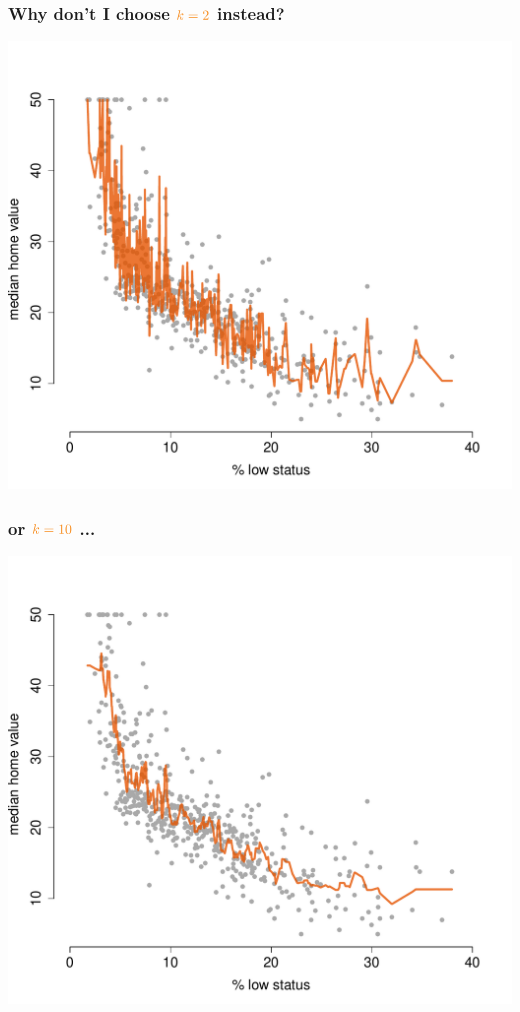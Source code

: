 \documentclass{beamer}
\newcommand{\bo}[1]{\textcolor{burntorange}{#1}}
\begin{document}
\begin{frame}[plain]
\frametitle{Why don't I choose $\bo{k=2}$ instead?}
\vspace{-8mm}
\begin{center}
\includegraphics[scale=.44]{DaveBostonplotk=2i=1.pdf}
\end{center}
\end{frame}

\begin{frame}[plain]
\frametitle{or $\bo{k=10}$ ...}
\vspace{-8mm}
\begin{center}
\includegraphics[scale=.44]{DaveBostonplotk=10i=2.pdf}
\end{center}
\end{frame}
\end{document}
